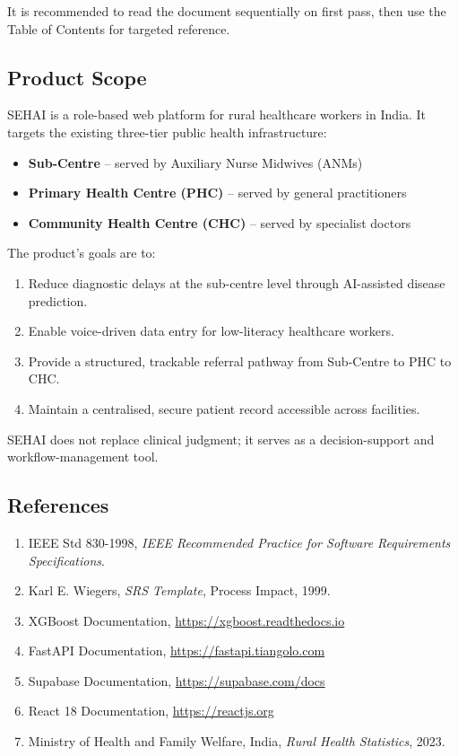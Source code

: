 \documentclass[12pt,a4paper]{article}
\begin{document}
It is recommended to read the document sequentially on first pass, then use the Table of Contents for targeted reference.

\subsection{Product Scope}
SEHAI is a role-based web platform for rural healthcare workers in India. It targets the existing three-tier public health infrastructure:

\begin{itemize}
    \item \textbf{Sub-Centre} -- served by Auxiliary Nurse Midwives (ANMs)
    \item \textbf{Primary Health Centre (PHC)} -- served by general practitioners
    \item \textbf{Community Health Centre (CHC)} -- served by specialist doctors
\end{itemize}

The product's goals are to:
\begin{enumerate}
    \item Reduce diagnostic delays at the sub-centre level through AI-assisted disease prediction.
    \item Enable voice-driven data entry for low-literacy healthcare workers.
    \item Provide a structured, trackable referral pathway from Sub-Centre to PHC to CHC.
    \item Maintain a centralised, secure patient record accessible across facilities.
\end{enumerate}

SEHAI does not replace clinical judgment; it serves as a decision-support and workflow-management tool.

\subsection{References}
\begin{enumerate}
    \item IEEE Std 830-1998, \textit{IEEE Recommended Practice for Software Requirements Specifications}.
    \item Karl E. Wiegers, \textit{SRS Template}, Process Impact, 1999.
    \item XGBoost Documentation, \url{https://xgboost.readthedocs.io}
    \item FastAPI Documentation, \url{https://fastapi.tiangolo.com}
    \item Supabase Documentation, \url{https://supabase.com/docs}
    \item React 18 Documentation, \url{https://reactjs.org}
    \item Ministry of Health and Family Welfare, India, \textit{Rural Health Statistics}, 2023.
\end{enumerate}
\end{document}
